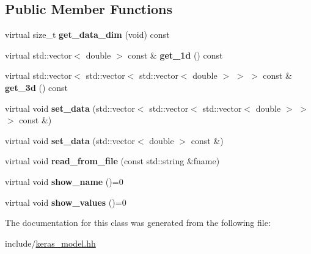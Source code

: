 \subsection*{Public Member Functions}
\begin{DoxyCompactItemize}
\item 
\mbox{\label{classkeras_1_1_data_chunk_a5e0df0452c7ae216c3c5fa45f340de7e}} 
virtual size\+\_\+t {\bfseries get\+\_\+data\+\_\+dim} (void) const
\item 
\mbox{\label{classkeras_1_1_data_chunk_ad261b35c28ca2a948609a76c2a32a078}} 
virtual std\+::vector$<$ double $>$ const  \& {\bfseries get\+\_\+1d} () const
\item 
\mbox{\label{classkeras_1_1_data_chunk_a662c5506ecbdb843d88ca5e314956c56}} 
virtual std\+::vector$<$ std\+::vector$<$ std\+::vector$<$ double $>$ $>$ $>$ const  \& {\bfseries get\+\_\+3d} () const
\item 
\mbox{\label{classkeras_1_1_data_chunk_aa7159bb0a04ede97f38f96f183dede1f}} 
virtual void {\bfseries set\+\_\+data} (std\+::vector$<$ std\+::vector$<$ std\+::vector$<$ double $>$ $>$ $>$ const \&)
\item 
\mbox{\label{classkeras_1_1_data_chunk_abf444fb632f728311dc0560f72a9dfdb}} 
virtual void {\bfseries set\+\_\+data} (std\+::vector$<$ double $>$ const \&)
\item 
\mbox{\label{classkeras_1_1_data_chunk_a26e11e6977aca85141aefd2d304698a4}} 
virtual void {\bfseries read\+\_\+from\+\_\+file} (const std\+::string \&fname)
\item 
\mbox{\label{classkeras_1_1_data_chunk_aa34ce27fb36e1c517688f26cc4d95c01}} 
virtual void {\bfseries show\+\_\+name} ()=0
\item 
\mbox{\label{classkeras_1_1_data_chunk_a57b1ebfc80d57917c675da96c4894585}} 
virtual void {\bfseries show\+\_\+values} ()=0
\end{DoxyCompactItemize}


The documentation for this class was generated from the following file\+:\begin{DoxyCompactItemize}
\item 
include/\mbox{\hyperlink{keras__model_8hh}{keras\+\_\+model.\+hh}}\end{DoxyCompactItemize}
